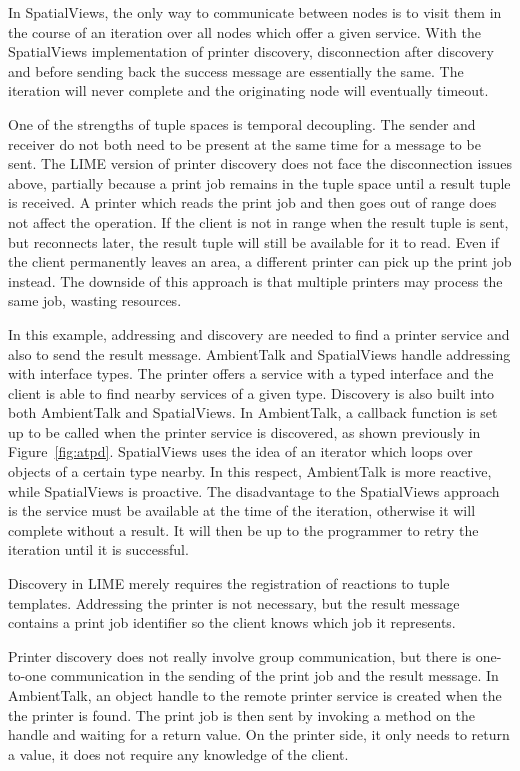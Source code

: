 \documentclass{sig-alternate}
\begin{document}
In SpatialViews, the only way to communicate between nodes is to visit them in the course of an iteration over all nodes which offer a given service. With the SpatialViews implementation of printer discovery, disconnection after discovery and before sending back the success message are essentially the same. The iteration will never complete and the originating node will eventually timeout.

One of the strengths of tuple spaces is temporal decoupling. The sender and receiver do not both need to be present at the same time for a message to be sent. The LIME version of printer discovery does not face the disconnection issues above, partially because a print job remains in the tuple space until a result tuple is received. A printer which reads the print job and then goes out of range does not affect the operation. If the client is not in range when the result tuple is sent, but reconnects later, the result tuple will still be available for it to read. Even if the client permanently leaves an area, a different printer can pick up the print job instead. The downside of this approach is that multiple printers may process the same job, wasting resources.


In this example, addressing and discovery are needed to find a printer service and also to send the result message. AmbientTalk and SpatialViews handle addressing with interface types. The printer offers a service with a typed interface and the client is able to find nearby services of a given type. Discovery is also built into both AmbientTalk and SpatialViews. In AmbientTalk, a callback function is set up to be called when the printer service is discovered, as shown previously in Figure~\ref{fig:atpd}. SpatialViews uses the idea of an iterator which loops over objects of a certain type nearby. In this respect, AmbientTalk is more reactive, while SpatialViews is proactive. The disadvantage to the SpatialViews approach is the service must be available at the time of the iteration, otherwise it will complete without a result. It will then be up to the programmer to retry the iteration until it is successful.

Discovery in LIME merely requires the registration of reactions to tuple templates. Addressing the printer is not necessary, but the result message contains a print job identifier so the client knows which job it represents.

Printer discovery does not really involve group communication, but there is one-to-one communication in the sending of the print job and the result message. In AmbientTalk, an object handle to the remote printer service is created when the the printer is found. The print job is then sent by invoking a method on the handle and waiting for a return value. On the printer side, it only needs to return a value, it does not require any knowledge of the client.
\end{document}
